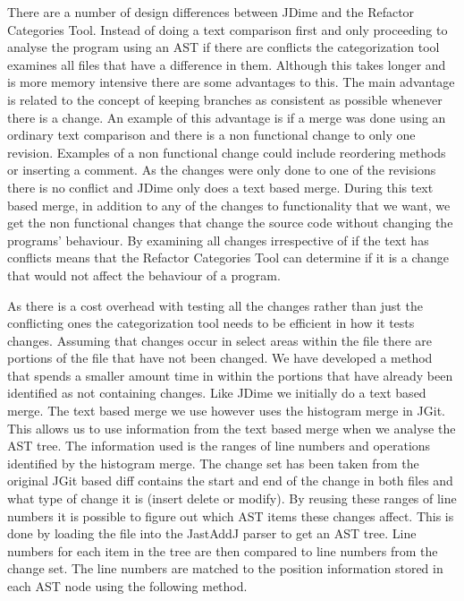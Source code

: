 There are a number of design differences between JDime and the Refactor Categories Tool.  Instead of doing a text comparison first and only proceeding to analyse the program using an AST if there are conflicts the categorization tool examines all files that have a difference in them.  Although this takes longer and is more memory intensive there are some advantages to this. The main advantage is related to the concept of keeping branches as consistent as possible whenever there is a change. An example of this advantage is if a merge was done using an ordinary text comparison and there is a non functional change to only one revision. Examples of a non functional change could include reordering methods or inserting a comment.  As the changes were only done to one of the revisions there is no conflict and JDime only does a text based merge.  During this text based merge, in addition to any of the changes to functionality that we want, we get the non functional changes that change the source code without changing the programs' behaviour. By examining all changes irrespective of if the text has conflicts means that the Refactor Categories Tool can determine if it is a change that would not affect the behaviour of a program.

As there is a cost overhead with testing all the changes rather than just the conflicting ones the categorization tool needs to be efficient in how it tests changes.  Assuming that changes occur in select areas within the file there are portions of the file that have not been changed.  We have developed a method that spends a smaller amount time in  within the portions that have already been identified as not containing changes.  Like JDime we initially do a text based merge.  The text based merge we use however uses the histogram merge in JGit.  This allows us to use information from the text based merge when we analyse the AST tree.  The information used is the ranges of line numbers and operations identified by the histogram merge. The change set has been taken from the original JGit based diff contains the start and end of the change in both files and what type of change it is (insert delete or modify).  By reusing these ranges of line numbers it is possible to figure out which AST items these changes affect. This is done by loading the file into the JastAddJ parser to get an AST tree. Line numbers for each item in the tree are then compared to line numbers from the change set. The line numbers are matched to the position information stored in each AST node using the following method.

